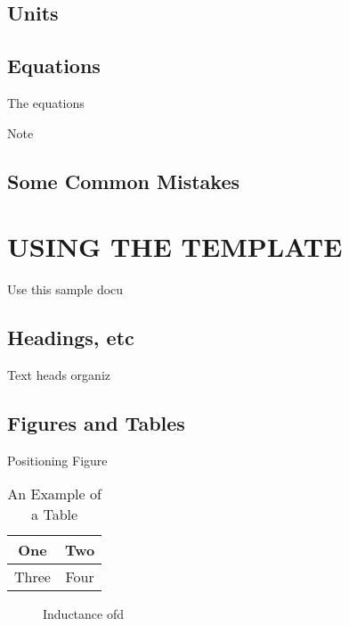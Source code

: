 \documentclass[letterpaper, 10 pt, conference]{ieeeconf}  %
\begin{document}
\subsection{Units}



\subsection{Equations}

The equations



Note

\subsection{Some Common Mistakes}

\section{USING THE TEMPLATE}

Use this sample docu

\subsection{Headings, etc}

Text heads organiz

\subsection{Figures and Tables}

Positioning Figure



\begin{table}[h]
\caption{An Example of a Table}
\label{table_example}
\begin{center}
\begin{tabular}{|c||c|}
\hline
One & Two\\
\hline
Three & Four\\
\hline
\end{tabular}
\end{center}
\end{table}


   \begin{figure}[thpb]
      \centering
      \caption{Inductance ofd}
      \label{figurelabel}
   \end{figure}
\end{document}
